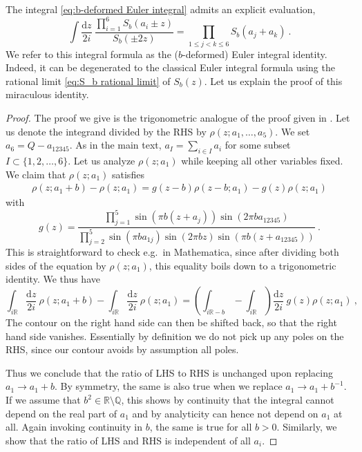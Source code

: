 \documentclass[12pt,a4paper]{article}
\newcommand{\be}{\begin{equation}}
\newcommand{\ee}{\end{equation}}
\renewcommand\d{\text{d}}
\newcommand\RR{\mathbb{R}}
\newcommand\QQ{\mathbb{Q}}
\begin{document}
The integral \eqref{eq:b-deformed Euler integral} admits an explicit evaluation,
\be 
\int \frac{\d z}{2i}\  \frac{\prod_{i=1}^6 S_b(a_i \pm z)}{S_b(\pm 2z)}= \prod_{1 \le j <k \le 6} S_b(a_j+a_k)\ . \label{eq:Euler integral formula}
\ee
We refer to this integral formula as the ($b$-deformed) Euler integral identity. Indeed, it can be degenerated to the classical Euler integral formula using the rational limit \eqref{eq:S_b rational limit} of $S_b(z)$.
Let us explain the proof of this miraculous identity.
\begin{proof}
The proof we give is the trigonometric analogue of the proof given in \cite{Spiridonov:proofs}. 
Let us denote the integrand divided by the RHS by $\rho(z;a_1,\dots,a_5)$. We set $a_6=Q-a_{12345}$. As in the main text, $a_I=\sum_{i \in I} a_i$ for some subset $I \subset \{1,2,\dots,6\}$. Let us analyze $\rho(z;a_1)$ while keeping all other variables fixed. We claim that $\rho(z;a_1)$ satisfies
\begin{align}
    \rho(z;a_1+b)-\rho(z;a_1)=g(z-b) \rho(z-b;a_1)-g(z) \rho(z;a_1)
\end{align}
with 
\be 
g(z)=\frac{\prod_{j=1}^5 \sin(\pi b(z+a_j)) \sin(2\pi b a_{12345})}{\prod_{j=2}^5 \sin(\pi ba_{1j}) \sin(2\pi b z) \sin(\pi b (z+a_{12345}))}\ .
\ee
This is straightforward to check e.g.\ in Mathematica, since after dividing both sides of the equation by $\rho(z;a_1)$, this equality boils down to a trigonometric identity. We thus have
\be 
\int_{i \RR} \frac{\mathrm{d}z}{2i}\ \rho(z;a_1+b)-\int_{i \RR} \frac{\mathrm{d}z}{2i}\ \rho(z;a_1)=\left(\int_{i\RR-b}-\int_{i \RR}\right) \frac{\d z}{2i}\ g(z) \rho(z;a_1)\ ,
\ee
The contour on the right hand side can then be shifted back, so that the right hand side vanishes.
 Essentially by definition we do not pick up any poles on the RHS, since our contour avoids by assumption all poles. 

Thus we conclude that the ratio of LHS to RHS is unchanged upon replacing $a_1 \to a_1+b$. By symmetry, the same is also true when we replace $a_1 \to a_1+b^{-1}$. If we assume that $b^2 \in \RR \setminus \QQ$, this shows by continuity that the integral cannot depend on the real part of $a_1$ and by analyticity can hence not depend on $a_1$ at all. Again invoking continuity in $b$, the same is true for all $b>0$. Similarly, we show that the ratio of LHS and RHS is independent of all $a_i$. 


\end{proof}
\end{document}
